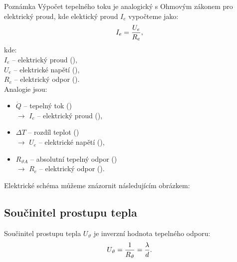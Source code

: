 \documentclass{article}
\begin{document}
\begin{notebox}{Poznámka}
    Výpočet tepelného toku je analogický s Ohmovým zákonem pro elektrický proud, kde elektický proud $I_e$ vypočteme jako:
    \begin{equation}
        I_e = \frac{U_e}{R_e},
        \unit{(\ueqA)}
    \end{equation}
    kde:\\
    $I_e$ -- elektrický proud (\ueqA),\\
    $U_e$ -- elektrické napětí (\ueqV),\\
    $R_e$ -- elektrický odpor (\ueqOHM).\\

    Analogie jsou:
    \begin{itemize}
        \item $\dot{Q}$ -- tepelný tok (\ueqW)\\ $\rightarrow$ $I_e$ -- elektrický proud (\ueqA),
        \item $\Delta T$ -- rozdíl teplot (\ueqK)\\ $\rightarrow$ $U_e$ -- elektrické napětí (\ueqV),
        \item $R_{\vartheta A}$ -- absolutní tepelný odpor (\ueqKandWinv)\\ $\rightarrow$ $R_e$ -- elektrický odpor (\ueqOHM).
    \end{itemize}

    Elektrické schéma můžeme znázornit následujícím obrázkem:

    \begin{center}
    \end{center}
\end{notebox}



\subsection{Součinitel prostupu tepla}
Součinitel prostupu tepla $U_\vartheta$ je inverzní hodnota tepelného odporu:
\begin{equation}
    U_\vartheta = \frac{1}{R_{\vartheta}} = \frac{\lambda}{d}.
    \unit{(\ueqWandMinvsqKinv)}
\end{equation}
\end{document}
